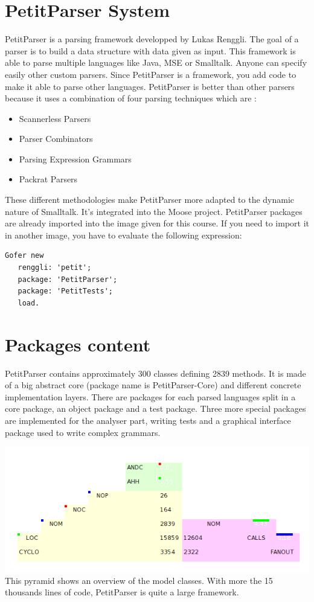 

\usepackage{lipsum}





\section{PetitParser System}
PetitParser is a parsing framework developped by Lukas Renggli. The goal of a parser is to build a data structure with data given as input. This framework is able to parse multiple languages like Java, MSE or Smalltalk. Anyone can specify easily other custom parsers. Since PetitParser is a framework, you add code to make it able to parse other languages.
PetitParser is better than other parsers because it uses a combination of four parsing techniques which are :
\begin{itemize}
\item Scannerless Parsers
\item Parser Combinators
\item Parsing Expression Grammars
\item Packrat Parsers
\end{itemize}
These different methodologies make PetitParser more adapted to the dynamic nature of Smalltalk.
It's integrated into the Moose project. PetitParser packages are already imported into the image given for this course. If you need to import it in another image, you have to evaluate the following expression: 
\begin{lstlisting}
Gofer new
   renggli: 'petit'; 
   package: 'PetitParser';
   package: 'PetitTests';
   load.
\end{lstlisting}

\section{Packages content}

PetitParser contains approximately 300 classes defining 2839 methods. It is made of a big abstract core (package name is PetitParser-Core) and different concrete implementation layers. There are packages for each parsed languages split in a core package, an object package and a test package. Three more special packages are implemented for the analyser part, writing tests and a graphical interface package used to write complex grammars. 

\includegraphics[scale=0.6]{overview.png}\\
This pyramid shows an overview of the model classes. With more the 15 thousands lines of code, PetitParser is quite a large framework. 

